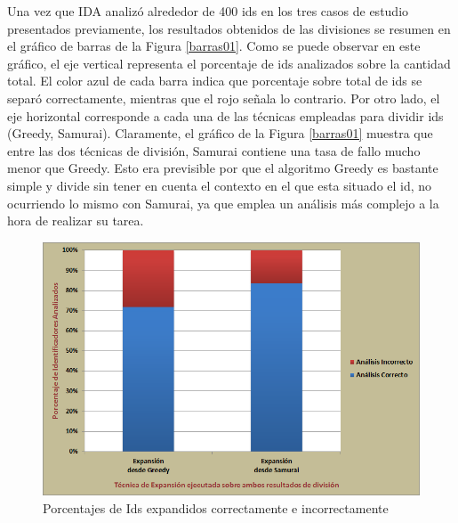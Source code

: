 Una vez que IDA analizó alrededor de 400 ids en los tres casos de estudio presentados previamente, los resultados obtenidos de las divisiones se resumen en el gráfico de barras de la Figura \ref{barras01}. Como se puede observar en este gráfico, el eje vertical representa el porcentaje de ids analizados sobre la cantidad total. El color azul de cada barra indica que porcentaje sobre total de ids se separó correctamente, mientras que el rojo señala lo contrario. Por otro lado, el eje horizontal corresponde a cada una de las técnicas empleadas para dividir ids (Greedy, Samurai).
Claramente, el gráfico de la Figura \ref{barras01} muestra que entre las dos técnicas de división, Samurai contiene una tasa de fallo mucho menor que Greedy. Esto era previsible por que el algoritmo Greedy es bastante simple y divide sin tener en cuenta el contexto en el que esta situado el id, no ocurriendo lo mismo con Samurai, ya que emplea un análisis más complejo a la hora de realizar su tarea.

\begin{figure}[t!] %
\centerline{%
\includegraphics[scale= 0.64]{./cap5/barras_02.png}
}
\caption{Porcentajes de Ids expandidos correctamente e incorrectamente}
\label{barras02}
\end{figure}


